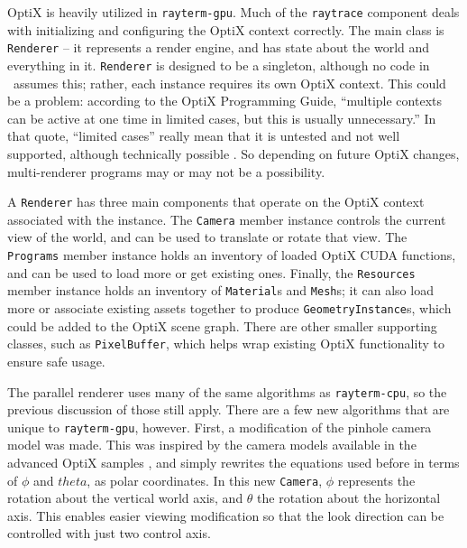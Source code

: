  \label{ch:methods:renderer:parallel:design}

OptiX is heavily utilized in \texttt{rayterm-gpu}.
Much of the \texttt{raytrace} component deals with initializing and configuring the OptiX context correctly.
The main class is \texttt{Renderer} -- it represents a render engine, and has state about the world and everything in it.
\texttt{Renderer} is designed to be a singleton, although no code in \name\ assumes this; rather, each instance requires its own OptiX context.
This could be a problem: according to the OptiX Programming Guide, ``multiple contexts can be active at one time in limited cases, but this is usually unnecessary.''
In that quote, ``limited cases'' really mean that it is untested and not well supported, although technically possible \cite{nvidia2019optixdoc}.
So depending on future OptiX changes, multi-renderer programs may or may not be a possibility.

A \texttt{Renderer} has three main components that operate on the OptiX context associated with the instance.
The \texttt{Camera} member instance controls the current view of the world, and can be used to translate or rotate that view.
The \texttt{Programs} member instance holds an inventory of loaded OptiX CUDA functions, and can be used to load more or get existing ones.
Finally, the \texttt{Resources} member instance holds an inventory of \texttt{Material}s and \texttt{Mesh}s; it can also load more or associate existing assets together to produce \texttt{GeometryInstance}s, which could be added to the OptiX scene graph.
There are other smaller supporting classes, such as \texttt{PixelBuffer}, which helps wrap existing OptiX functionality to ensure safe usage.

 \label{ch:methods:renderer:parallel:algorithms}

The parallel renderer uses many of the same algorithms as \texttt{rayterm-cpu}, so the previous discussion of those still apply.
There are a few new algorithms that are unique to \texttt{rayterm-gpu}, however.
First, a modification of the pinhole camera model was made.
This was inspired by the camera models available in the advanced OptiX samples \cite{optixsamples}, and simply rewrites the equations used before in terms of $\phi$ and $theta$, as polar coordinates.
In this new \texttt{Camera}, $\phi$ represents the rotation about the vertical world axis, and $\theta$ the rotation about the horizontal axis.
This enables easier viewing modification so that the look direction can be controlled with just two control axis.

